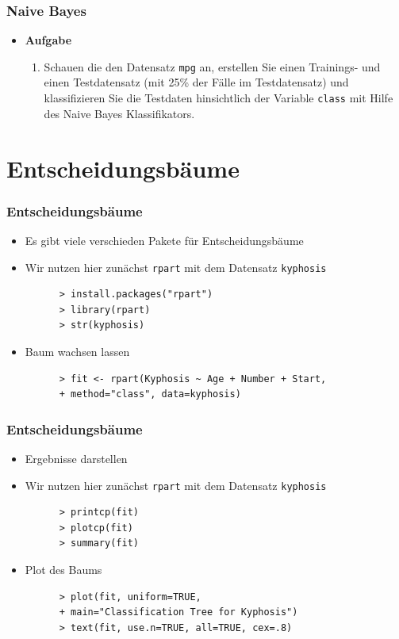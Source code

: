 \documentclass{beamer}
\begin{document}
\begin{frame}[fragile]
  \frametitle{Naive Bayes}
  \begin{itemize}
    \item \textbf{Aufgabe} \\ 
         \begin{enumerate}
      		\item Schauen die den Datensatz \Verb+mpg+ an, erstellen Sie einen Trainings- und einen Testdatensatz (mit 25\% der Fälle im Testdatensatz) und klassifizieren Sie die Testdaten hinsichtlich der Variable \Verb+class+ mit Hilfe des Naive Bayes Klassifikators.
    \end{enumerate}
  \end{itemize}
\end{frame}

\section{Entscheidungsbäume}

\begin{frame}[fragile]
  \frametitle{Entscheidungsbäume}
  \begin{itemize}
    \item Es gibt viele verschieden Pakete für Entscheidungsbäume
    \item Wir nutzen hier zunächst \Verb+rpart+ mit dem Datensatz \Verb+kyphosis+
    \begin{Verbatim}
      > install.packages("rpart")
      > library(rpart)
      > str(kyphosis)
    \end{Verbatim}
    \item Baum wachsen lassen
    \begin{Verbatim}
      > fit <- rpart(Kyphosis ~ Age + Number + Start, 
      + method="class", data=kyphosis)
    \end{Verbatim}
      \end{itemize}
\end{frame}

\begin{frame}[fragile]
  \frametitle{Entscheidungsbäume}
  \begin{itemize}
    \item Ergebnisse darstellen
    \item Wir nutzen hier zunächst \Verb+rpart+ mit dem Datensatz \Verb+kyphosis+
    \begin{Verbatim}
      > printcp(fit) 
      > plotcp(fit) 
      > summary(fit)
    \end{Verbatim}
    \item Plot des Baums
    \begin{Verbatim}
      > plot(fit, uniform=TRUE, 
      + main="Classification Tree for Kyphosis")
      > text(fit, use.n=TRUE, all=TRUE, cex=.8)
    \end{Verbatim}
      \end{itemize}
\end{frame}
\end{document}
